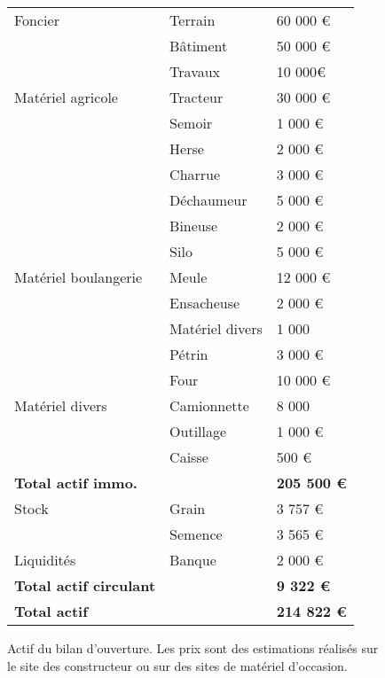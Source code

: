 \documentclass{book}
\begin{document}
\begin{figure}[h!]
\footnotesize
\center
\begin{tabular}{ | p{3cm} | p{2cm}| p{2cm}| }

\hline
	Foncier & Terrain & 60 000 \euro{} \\ 
	 & Bâtiment & 50 000 \euro{} \\ 
	 & Travaux & 10 000\euro{} \\ \hline
	Matériel agricole & Tracteur & 30 000 \euro{} \\ 
	 & Semoir & 1 000 \euro{} \\ 
	 & Herse & 2 000 \euro{} \\ 
	 & Charrue & 3 000 \euro{}\\ 
	 & Déchaumeur & 5 000 \euro{}\\ 
	 & Bineuse & 2 000 \euro{}\\ 
	 & Silo & 5 000 \euro{}\\ \hline
	Matériel boulangerie & Meule & 12 000 \euro{}\\ 
	 & Ensacheuse & 2 000 \euro{}\\ 
	 & Matériel divers & 1 000  \\ 
	 & Pétrin & 3 000 \euro{}\\ 
	 & Four & 10 000 \euro{}\\ \hline
	Matériel divers & Camionnette & 8 000  \\ 
	 & Outillage & 1 000 \euro{}\\ 
	 & Caisse & 500 \euro{}\\ \hline
	\textbf{Total actif immo.} & &\textbf{205 500 \euro{}}  \\ \hline
	\hline
	Stock & Grain & 3 757 \euro{}\\ 
	 & Semence & 3 565 \euro{}\\ \hline
	Liquidités & Banque & 2 000 \euro{}\\ \hline
	\textbf{Total actif circulant} & & \textbf{9 322 \euro{}}  \\ \hline
	\hline
	\textbf{Total actif} & & \textbf{214 822 \euro{}}  \\ \hline

\end{tabular}
\caption{Actif du bilan d'ouverture. Les prix sont des estimations réalisés sur le site des constructeur ou sur des sites de matériel d'occasion.}
\label{tab:actif}
\end{figure}
\end{document}
